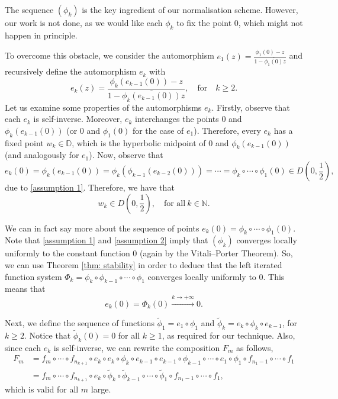 \documentclass[11pt, reqno]{amsart}
\theoremstyle{definition}
\numberwithin{equation}{section}
\newcommand{\N}{\mathbb{N}}
\newcommand{\D}{\mathbb{D}}
\renewcommand{\geq}{\geqslant}
\begin{document}
The sequence $(\phi_k)$ is the key ingredient of our normalisation scheme. However, our work is not done, as we would like each $\phi_k$ to fix the point 0, which might not happen in principle. 

To overcome this obstacle, we consider the automorphism $e_1(z)=\frac{\phi_1(0)-z}{1-\overline{\phi_1(0)}z}$ and recursively define the automorphism $e_k$ with
\[
e_k(z)=\frac{\phi_k(e_{k-1}(0))-z}{1-\overline{\phi_k(e_{k-1}(0))}z}, \quad\text{for}\quad k\geq2.
\]
Let us examine some properties of the automorphisms $e_k$. Firstly, observe that each $e_k$ is self-inverse. Moreover, $e_k$ interchanges the points 0 and $\phi_k(e_{k-1}(0))$ (or 0 and $\phi_1(0)$ for the case of $e_1$). Therefore, every $e_k$ has a fixed point $w_k\in\D$, which is the hyperbolic midpoint
of 0 and $\phi_k(e_{k-1}(0))$ (and analogously for $e_1$). Now, observe that 
\begin{equation}\label{eq: ek in disc}
e_k(0)=\phi_k(e_{k-1}(0))=\phi_k(\phi_{k-1}(e_{k-2}(0)))=\cdots=\phi_k\circ\cdots\circ \phi_1(0)\in D\left(0,\frac{1}{2}\right),
\end{equation}
due to \eqref{assumption 1}. Therefore, we have that
\begin{equation}\label{eq: fixed points of ek}
w_k\in D\left(0,\frac{1}{2}\right), \quad \text{for all}\ k\in\N.
\end{equation}

We can in fact say more about the sequence of points $e_k(0)=\phi_k\circ\cdots\circ\phi_1(0)$. Note that \eqref{assumption 1} and \eqref{assumption 2} imply that $(\phi_k)$ converges locally uniformly to the constant function 0 (again by the Vitali--Porter Theorem). So, we can use Theorem \ref{thm: stability} in order to deduce that the left iterated function system $\Phi_k=\phi_k\circ \phi_{k-1}\circ\cdots \circ \phi_1$ converges locally uniformly to 0. This means that
\begin{equation}\label{eq: ek converges to 0}
e_k(0)=\Phi_k(0)\xrightarrow{k\to+\infty}0.
\end{equation}

Next, we define the sequence of functions $\widetilde{\phi}_1=e_1\circ\phi_1$ and $\widetilde{\phi}_k=e_k\circ \phi_k\circ e_{k-1}$, for $k\geq 2$. Notice that $\widetilde{\phi}_k(0)=0$ for all $k\geq1$, as required for our technique. Also, since each $e_k$ is self-inverse, we can rewrite the composition $F_m$ as follows,
\begin{align}
F_m&=f_m\circ \cdots \circ f_{n_{k+1}}\circ e_k\circ e_k \circ \phi_k \circ e_{k-1}\circ e_{k-1}\circ \phi_{k-1}\circ\cdots \circ e_1\circ \phi_1\circ f_{n_1-1}\circ\cdots \circ f_1\nonumber\\
	&= f_m\circ\cdots \circ f_{n_{k+1}}\circ e_k\circ \widetilde{\phi}_k\circ \widetilde{\phi}_{k-1}\circ \cdots\circ \widetilde{\phi}_1\circ f_{n_1-1}\circ\cdots \circ f_1,\label{Fm}
\end{align}
which is valid for all $m$ large. 
\end{document}
